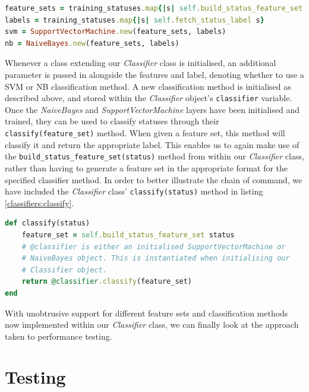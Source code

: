 \begin{lstlisting}[language=Ruby, caption={Example initialisation of LIBSVM and AI4R Naive Bayes classifiers through intermediary layer}, label=classifiers:build_classifiers]
feature_sets = training_statuses.map{|s| self.build_status_feature_set s}
labels = training_statuses.map{|s| self.fetch_status_label s}
svm = SupportVectorMachine.new(feature_sets, labels)
nb = NaiveBayes.new(feature_sets, labels)
\end{lstlisting}

Whenever a class extending our \emph{Classifier} class is initialised, an additional parameter is passed in alongside the features and label, denoting whether to use a SVM or NB classification method. A new classification method is initialised as described above, and stored within the \emph{Classifier} object's \texttt{classifier} variable. Once the \emph{NaiveBayes} and \emph{SupportVectorMachine} layers have been initialised and trained, they can be used to classify statuses through their \texttt{classify(feature\_set)} method. When given a feature set, this method will classify it and return the appropriate label. This enables us to again make use of the \texttt{build\-\_status\-\_feature\-\_set\-(status)} method from within our \emph{Classifier} class, rather than having to generate a feature set in the appropriate format for the specified classifier method. In order to better illustrate the chain of command, we have included the \emph{Classifier} class' \texttt{classify(status)} method in listing \ref{classifiers:classify}.

\begin{lstlisting}[language=Ruby, caption={\emph{Classifier} class' classify method}, label=classifiers:classify]
def classify(status)
	feature_set = self.build_status_feature_set status
	# @classifier is either an initialised SupportVectorMachine or
	# NaiveBayes object. This is instantiated when initialising our
	# Classifier object.
	return @classifier.classify(feature_set) 
end
\end{lstlisting}

With unobtrusive support for different feature sets and classification methods now implemented within our \emph{Classifier} class, we can finally look at the approach taken to performance testing.

\section{Testing}

